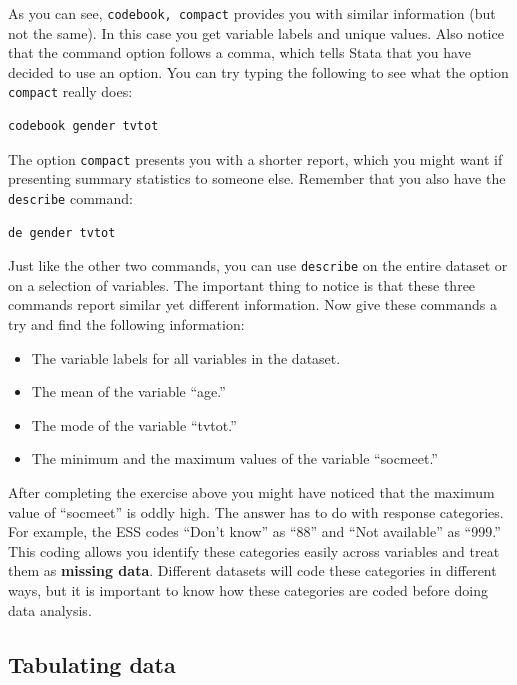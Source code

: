 \documentclass{article}
\begin{document}
As you can see, \texttt{codebook, compact} provides you with similar information (but not the same). In this case you get variable labels and unique values. Also notice that the command option follows a comma, which tells Stata that you have decided to use an option. You can try typing the following to see what the option \texttt{compact} really does:

\begin{lstlisting}
codebook gender tvtot
\end{lstlisting}

The option \texttt{compact} presents you with a shorter report, which you might want if presenting summary statistics to someone else. Remember that you also have the \texttt{describe} command:

\begin{lstlisting}
de gender tvtot
\end{lstlisting}

Just like the other two commands, you can use \texttt{describe} on the entire dataset or on a selection of variables. The important thing to notice is that these three commands report similar yet different information. Now give these commands a try and find the following information:

\begin{itemize}
	\item The variable labels for all variables in the dataset.
	\item The mean of the variable ``age.''
	\item The mode of the variable ``tvtot.''
	\item The minimum and the maximum values of the variable ``socmeet.''
\end{itemize}

After completing the exercise above you might have noticed that the maximum value of ``socmeet'' is oddly high. The answer has to do with response categories. For example, the ESS codes ``Don't know'' as ``88'' and ``Not available'' as ``999.'' This coding allows you identify these categories easily across variables and treat them as \textbf{missing data}. Different datasets will code these categories in different ways, but it is important to know how these categories are coded before doing data analysis.

\subsection*{Tabulating data}
\end{document}
